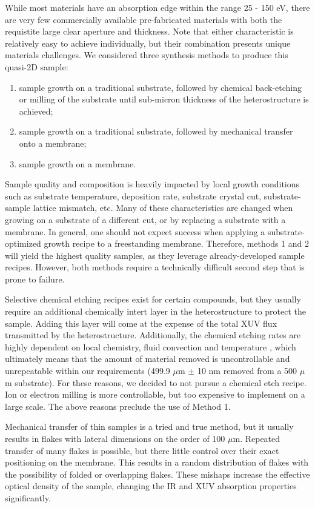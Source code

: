 While most materials have an absorption edge within the range 25 - 150 eV, there are very few commercially available pre-fabricated materials with both the requistite large clear aperture and thickness. Note that either characteristic is relatively easy to achieve individually, but their combination presents unique materials challenges. We considered three synthesis methods to produce this quasi-2D sample:
\begin{enumerate}
	\item sample growth on a traditional substrate, followed by chemical back-etching or milling of the substrate until sub-micron thickness of the heterostructure is achieved;
	\item sample growth on a traditional substrate, followed by mechanical transfer onto a membrane;
	\item sample growth on a membrane.
\end{enumerate}
Sample quality and composition is heavily impacted by local growth conditions such as substrate temperature, deposition rate, substrate crystal cut, substrate-sample lattice mismatch, etc. Many of these characteristics are changed when growing on a substrate of a different cut, or by replacing a substrate with a membrane. In general, one should not expect success when applying a substrate-optimized growth recipe to a freestanding membrane. Therefore, methods 1 and 2 will yield the highest quality samples, as they leverage already-developed sample recipes. However, both methods require a technically difficult second step that is prone to failure.

Selective chemical etching recipes exist for certain compounds, but they usually require an additional chemically intert layer in the heterostructure to protect the sample. Adding this layer will come at the expense of the total XUV flux transmitted by the heterostructure. Additionally, the chemical etching rates are highly dependent on local chemistry, fluid convection and temperature \cite{chiuPhotoluminescenceEvolutionGaAs2015}, which ultimately means that the amount of material removed is uncontrollable and unrepeatable within our requirements (499.9 $\mu$m $\pm$ 10 nm removed from a 500 $\mu$m substrate). For these reasons, we decided to not pursue a chemical etch recipe. Ion or electron milling is more controllable, but too expensive to implement on a large scale. The above reasons preclude the use of Method 1.

Mechanical transfer of thin samples is a tried and true method, but it usually results in flakes with lateral dimensions on the order of 100 $\mu$m. Repeated transfer of many flakes is possible, but there little control over their exact positioning on the membrane. This results in a random distribution of flakes with the possibility of folded or overlapping flakes. These mishaps increase the effective optical density of the sample, changing the IR and XUV absorption properties significantly.

